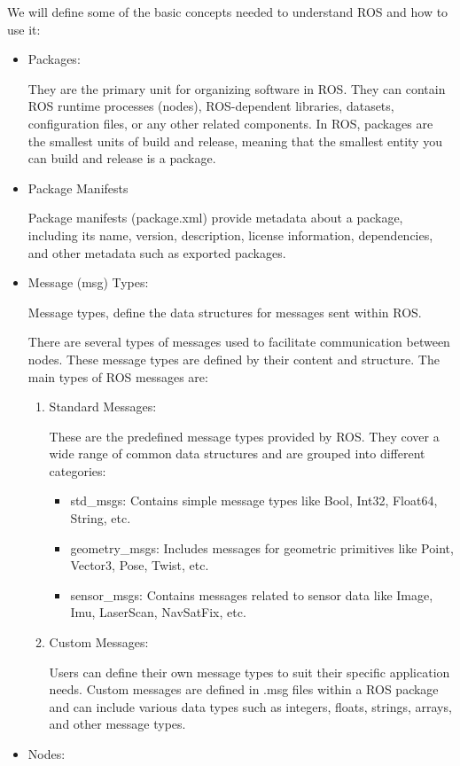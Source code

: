 We will define some of the basic concepts needed to understand ROS and how to use it:
\begin{itemize}
	\item Packages: 
	
	They are the primary unit for organizing software in ROS. They can contain ROS runtime processes (nodes), ROS-dependent libraries, datasets, configuration files, or any other related components. In ROS, packages are the smallest units of build and release, meaning that the smallest entity you can build and release is a package.
	\item Package Manifests
	
	Package manifests (package.xml) provide metadata about a package, including its name, version, description, license information, dependencies, and other metadata such as exported packages.
	
	\item Message (msg) Types:
	
	Message types, define the data structures for messages sent within ROS.
	
	There are several types of messages used to facilitate communication between nodes. These message types are defined by their content and structure. The main types of ROS messages are:
	\begin{enumerate}
		\item Standard Messages:
		
		These are the predefined message types provided by ROS. They cover a wide range of common data structures and are grouped into different categories:
		
		\begin{itemize}
			\item std\_msgs: 
			Contains simple message types like Bool, Int32, Float64, String, etc.
			\item geometry\_msgs:
			Includes messages for geometric primitives like Point, Vector3, Pose, Twist, etc.
			\item sensor\_msgs:
			Contains messages related to sensor data like Image, Imu, LaserScan, NavSatFix, etc.
		\end{itemize}
		\item Custom Messages:
		
		Users can define their own message types to suit their specific application needs. Custom messages are defined in .msg files within a ROS package and can include various data types such as integers, floats, strings, arrays, and other message types.
	\end{enumerate}    
	\item Nodes:
	

\end{itemize}
